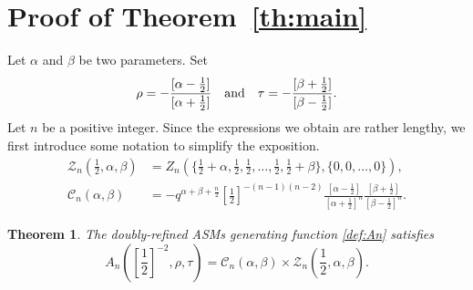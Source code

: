 \documentclass[12pt, a4paper]{amsart} %
\numberwithin{equation}{section}
\newtheorem{theorem}{Theorem}[section]
\begin{document}
\section{Proof of Theorem~\ref{th:main}}\label{sec:proof_mth} %
Let $\alpha$ and $\beta$ be two parameters. Set 
$$
\rho=-\frac{[\alpha-\frac{1}{2}]}{[\alpha+\frac{1}{2}]} \text{\quad and\quad}
\tau=-\frac{[\beta+\frac{1}{2}]}{[\beta-\frac{1}{2}]}.
$$
Let $n$ be a positive integer.  
Since the expressions we obtain are rather lengthy, we first introduce some notation to simplify the exposition.
\begin{align*}
\mathcal{Z}_n(\frac{1}{2},\alpha, \beta) 
&= Z_n(\{\frac{1}{2} +\alpha, \frac{1}{2}, \frac{1}{2}, \dots, \frac{1}{2}, \frac{1}{2} + \beta\},
\{0, 0,\dots, 0\}),\\
	\mathcal{C}_n(\alpha, \beta)&=
-q^{\alpha+\beta+\frac{n}{2}}[\frac12]^{-{(n-1)(n-2)}}\frac{[\alpha-\frac{1}{2}]}{[\alpha+\frac{1}{2}]^n}\frac{[\beta+\frac{1}{2}]}{[\beta-\frac{1}{2}]^n}.
\end{align*}
\begin{theorem}\label{th:A=CZ} 
	The doubly-refined ASMs generating function \eqref{def:An} satisfies
    \begin{equation}\label{athq}
			A_n([\frac12]^{-2},\rho,\tau)=\mathcal{C}_n(\alpha, \beta) \times \mathcal{Z}_n(\frac{1}{2},\alpha,\beta).
    \end{equation}
\end{theorem}
\end{document}
